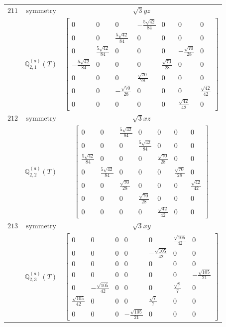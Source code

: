 \documentclass[fleqn,8pt,landscape]{jsarticle}
\begin{document}
\begin{longtable}{ccc}
$ 211 $ & $ \text{symmetry} $ & $ \sqrt{3} y z $ \\
$  $ & $ \mathbb{Q}_{2,1}^{(a)}(T) $ & $ \begin{bmatrix} 0 & 0 & 0 & - \frac{5 \sqrt{42}}{84} & 0 & 0 & 0 \\ 0 & 0 & \frac{5 \sqrt{42}}{84} & 0 & 0 & 0 & 0 \\ 0 & \frac{5 \sqrt{42}}{84} & 0 & 0 & 0 & - \frac{\sqrt{70}}{28} & 0 \\ - \frac{5 \sqrt{42}}{84} & 0 & 0 & 0 & \frac{\sqrt{70}}{28} & 0 & 0 \\ 0 & 0 & 0 & \frac{\sqrt{70}}{28} & 0 & 0 & 0 \\ 0 & 0 & - \frac{\sqrt{70}}{28} & 0 & 0 & 0 & \frac{\sqrt{42}}{42} \\ 0 & 0 & 0 & 0 & 0 & \frac{\sqrt{42}}{42} & 0 \end{bmatrix} $ \\ \hline
$ 212 $ & $ \text{symmetry} $ & $ \sqrt{3} x z $ \\
$  $ & $ \mathbb{Q}_{2,2}^{(a)}(T) $ & $ \begin{bmatrix} 0 & 0 & \frac{5 \sqrt{42}}{84} & 0 & 0 & 0 & 0 \\ 0 & 0 & 0 & \frac{5 \sqrt{42}}{84} & 0 & 0 & 0 \\ \frac{5 \sqrt{42}}{84} & 0 & 0 & 0 & \frac{\sqrt{70}}{28} & 0 & 0 \\ 0 & \frac{5 \sqrt{42}}{84} & 0 & 0 & 0 & \frac{\sqrt{70}}{28} & 0 \\ 0 & 0 & \frac{\sqrt{70}}{28} & 0 & 0 & 0 & \frac{\sqrt{42}}{42} \\ 0 & 0 & 0 & \frac{\sqrt{70}}{28} & 0 & 0 & 0 \\ 0 & 0 & 0 & 0 & \frac{\sqrt{42}}{42} & 0 & 0 \end{bmatrix} $ \\ \hline
$ 213 $ & $ \text{symmetry} $ & $ \sqrt{3} x y $ \\
$  $ & $ \mathbb{Q}_{2,3}^{(a)}(T) $ & $ \begin{bmatrix} 0 & 0 & 0 & 0 & 0 & \frac{\sqrt{105}}{42} & 0 \\ 0 & 0 & 0 & 0 & - \frac{\sqrt{105}}{42} & 0 & 0 \\ 0 & 0 & 0 & 0 & 0 & 0 & 0 \\ 0 & 0 & 0 & 0 & 0 & 0 & - \frac{\sqrt{105}}{21} \\ 0 & - \frac{\sqrt{105}}{42} & 0 & 0 & 0 & \frac{\sqrt{7}}{7} & 0 \\ \frac{\sqrt{105}}{42} & 0 & 0 & 0 & \frac{\sqrt{7}}{7} & 0 & 0 \\ 0 & 0 & 0 & - \frac{\sqrt{105}}{21} & 0 & 0 & 0 \end{bmatrix} $ \\ \hline

\end{longtable}
\end{document}
